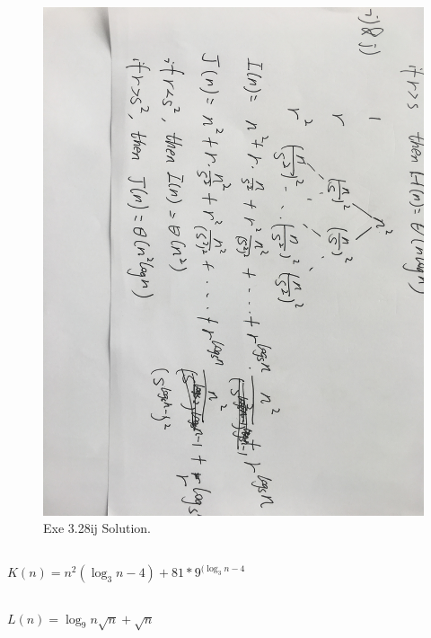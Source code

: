 \subsection{}
\begin{figure}[H]
  \includegraphics[width=\linewidth]{EX28ij.jpeg}
  \caption{Exe 3.28ij Solution.}
  \label{fig:solution 3.28ij}
\end{figure}

\subsection{}
$K(n) = n^2({\log_3 n}-4) + 81*9^{{(\log_3 n} - 4}$

\subsection{}
$L(n) = {\log_9 n}\sqrt{n} +\sqrt{n} $

